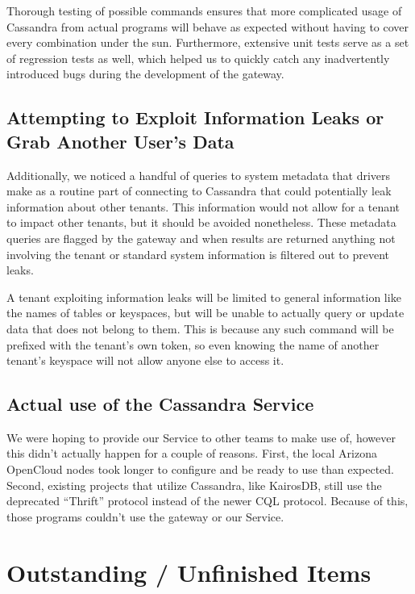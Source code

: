 \documentclass[11pt,notitlepage]{report}
\begin{document}
Thorough testing of possible commands ensures that more complicated usage of Cassandra from actual programs will behave as expected without having to cover every combination under the sun. Furthermore, extensive unit tests serve as a set of regression tests as well, which helped us to quickly catch any inadvertently introduced bugs during the development of the gateway.

\section*{Attempting to Exploit Information Leaks or Grab Another User’s Data}

Additionally, we noticed a handful of queries to system metadata that drivers make as a routine part of connecting to Cassandra that could potentially leak information about other tenants. This information would not allow for a tenant to impact other tenants, but it should be avoided nonetheless. These metadata queries are flagged by the gateway and when results are returned anything not involving the tenant or standard system information is filtered out to prevent leaks.

A tenant exploiting information leaks will be limited to general information like the names of tables or keyspaces, but will be unable to actually query or update data that does not belong to them. This is because any such command will be prefixed with the tenant’s own token, so even knowing the name of another tenant’s keyspace will not allow anyone else to access it.


\section*{Actual use of the Cassandra Service}

We were hoping to provide our Service to other teams to make use of, however this didn’t actually happen for a couple of reasons. First, the local Arizona OpenCloud nodes took longer to configure and be ready to use than expected. Second, existing projects that utilize Cassandra, like KairosDB, still use the deprecated “Thrift” protocol instead of the newer CQL protocol. Because of this, those programs couldn’t use the gateway or our Service.


\chapter*{Outstanding / Unfinished Items}
\end{document}
